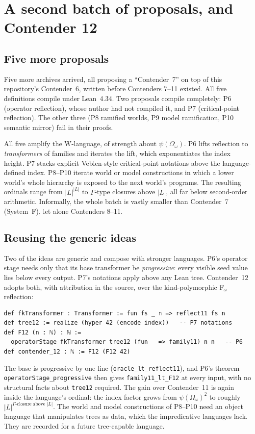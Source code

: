 \documentclass[11pt]{article}
\theoremstyle{definition}
\theoremstyle{remark}
\newcommand{\lean}[1]{\texttt{#1}}
\begin{document}
\section{A second batch of proposals, and Contender 12}

\subsection{Five more proposals}
Five more archives arrived, all proposing a ``Contender~7'' on top of this
repository's Contender~6, written before Contenders 7--11 existed. All five
definitions compile under Lean~4.34. Two proposals compile completely: P6
(operator reflection), whose author had not compiled it, and P7
(critical-point reflection). The other three (P8 ramified worlds, P9 model
ramification, P10 semantic mirror) fail in their proofs.

All five amplify the W-language, of strength about $\psi(\Omega_\omega)$.
P6 lifts reflection to \emph{transformers} of families and iterates the lift,
which exponentiates the index height. P7 stacks explicit Veblen-style
critical-point notations above the language-defined index. P8--P10 iterate
world or model constructions in which a lower world's whole hierarchy is
exposed to the next world's programs. The resulting ordinals range from
$|L|^{|L|}$ to $\Gamma$-type closures above $|L|$, all far below second-order
arithmetic. Informally, the whole batch is vastly smaller than Contender~7
(System~F), let alone Contenders 8--11.

\subsection{Reusing the generic ideas}
Two of the ideas are generic and compose with stronger languages. P6's
operator stage needs only that its base transformer be \emph{progressive}:
every visible seed value lies below every output. P7's notations apply above
any Lean tree. Contender~12 adopts both, with attribution in the source, over
the kind-polymorphic F$_\omega$ reflection:
\begin{lstlisting}
def fkTransformer : Transformer := fun fs _ n => reflect11 fs n
def tree12 := realize (hyper 42 (encode index))   -- P7 notations
def F12 (n : ℕ) : ℕ :=
  operatorStage fkTransformer tree12 (fun _ => family11) n n   -- P6
def contender_12 : ℕ := F12 (F12 42)
\end{lstlisting}
The base is progressive by one line (\lean{oracle\_lt\_reflect11}), and P6's
theorem \lean{operatorStage\_\allowbreak progressive} then gives \lean{family11\_lt\_F12}
at every input, with no structural facts about \lean{tree12} required. The
gain over Contender~11 is again inside the language's ordinal: the index factor
grows from $\psi(\Omega_\omega)^2$ to roughly
$|L|^{\Gamma\text{-closure above }|L|}$. The world and model constructions of
P8--P10 need an object language that manipulates trees as data, which the
impredicative languages lack. They are recorded for a future tree-capable
language.
\end{document}
